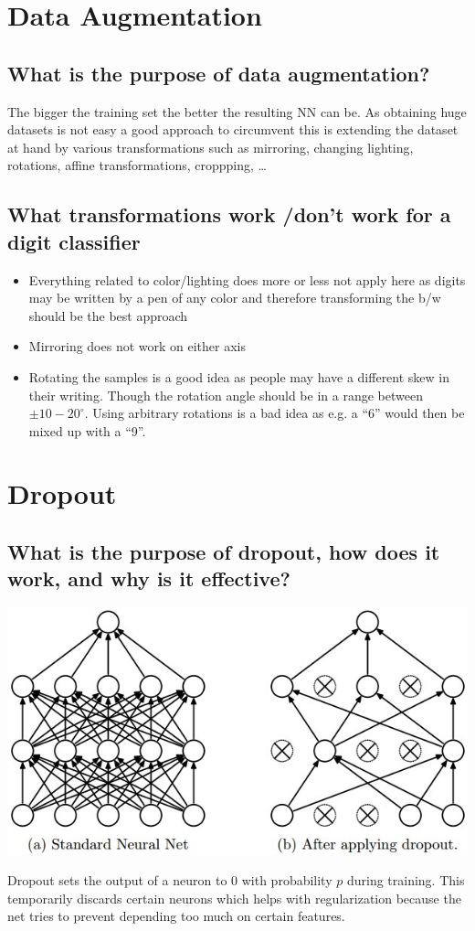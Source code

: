 \section{Data Augmentation}
\subsection{What is the purpose of data augmentation?}
The bigger the training set the better the resulting NN can be. As obtaining huge datasets is not easy a good approach to circumvent this is extending the dataset at hand by various transformations such as mirroring, changing lighting, rotations, affine transformations, croppping, \ldots
\subsection{What transformations work /don't work for a digit classifier}
\begin{itemize}
\item Everything related to color/lighting does more or less not apply here as digits may be written by a pen of any color and therefore transforming the b/w should be the best approach
\item Mirroring does not work on either axis
\item Rotating the samples is a good idea as people may have a different skew in their writing. Though the rotation angle should be in a range between $\pm 10-20^\circ$. Using arbitrary rotations is a bad idea as e.g. a ``6'' would then be mixed up with a ``9''.
\end{itemize}
%
\section{Dropout}
\subsection{What is the purpose of dropout, how does it work, and why is it effective?}
\begin{minipage}{0.4\textwidth}
\includegraphics[width=\textwidth]{./img/dropout.jpeg}
\end{minipage}
\begin{minipage}{0.6\textwidth}
Dropout sets the output of a neuron to 0 with probability $p$ during training. This temporarily discards certain neurons which helps with regularization because the net tries to prevent depending too much on certain features. 
\end{minipage}
